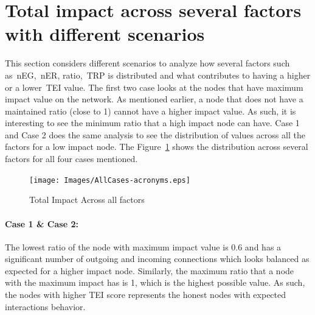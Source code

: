 \section{Total impact across several factors with different
scenarios}\label{Allcases}
This section considers different scenarios to analyze how several factors such
as~\ac{nEG},~\ac{nER}, ratio,~\ac{TRP} is distributed and what contributes to
having a higher or a lower~\ac{TEI} value. The first two case looks at the
nodes that have maximum impact value on the network. As mentioned earlier, a
node that does not have a maintained ratio (close to 1) cannot have a higher
impact value. As such, it is interesting to see the minimum ratio that a high
impact node can have. Case 1 and Case 2 does the same analysis to see the
distribution of values across all the factors for a low impact node. The
Figure~\ref{fig:allCases} shows the distribution across several factors for all
four cases mentioned. 
\begin{figure}[h]
	\texttt{[image: Images/AllCases-acronyms.eps]}
	\caption{Total Impact Across all factors}
	\label{fig:allCases}
\end{figure}
\paragraph{Case 1 \& Case 2:}The lowest ratio of the node with maximum impact
value is 0.6 and has a significant number of outgoing and incoming connections
which looks balanced as expected for a higher impact node. Similarly, the
maximum ratio that a node with the maximum impact has is 1, which is the
highest possible value. As such, the nodes with higher \ac{TEI} score
represents the honest nodes with expected interactions behavior. 
